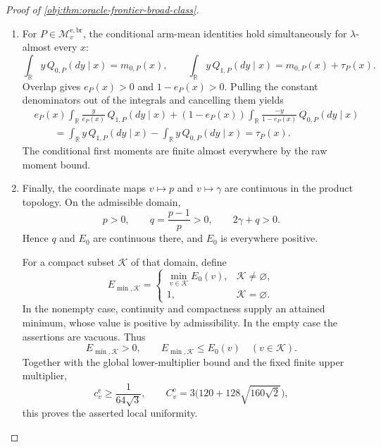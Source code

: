 \documentclass[11pt]{article}
\begin{document}
\begin{proof}[Proof of \cref{obj:thm:oracle-frontier-broad-class}]
\begin{enumerate}
\item For \(P\in\mathcal M_v^{\mathrm{e,br}}\), the conditional arm-mean identities hold simultaneously for \(\lambda\)-almost every \(x\):
\[
\int_{\mathbb R}y\,Q_{0,P}(dy\mid x)=m_{0,P}(x),
\qquad
\int_{\mathbb R}y\,Q_{1,P}(dy\mid x)
=m_{0,P}(x)+\tau_P(x).
\]
Overlap gives \(e_P(x)>0\) and \(1-e_P(x)>0\). Pulling the constant denominators out of the integrals and cancelling them yields
\[
\begin{aligned}
&e_P(x)\int_{\mathbb R}\frac{y}{e_P(x)}\,Q_{1,P}(dy\mid x)
+(1-e_P(x))\int_{\mathbb R}\frac{-y}{1-e_P(x)}\,Q_{0,P}(dy\mid x)\\
&\qquad=
\int_{\mathbb R}y\,Q_{1,P}(dy\mid x)
-\int_{\mathbb R}y\,Q_{0,P}(dy\mid x)
=\tau_P(x).
\end{aligned}
\]
The conditional first moments are finite almost everywhere by the raw moment bound.

\item Finally, the coordinate maps \(v\mapsto p\) and \(v\mapsto\gamma\) are continuous in the product topology. On the admissible domain,
\[
p>0,\qquad
q=\frac{p-1}{p}>0,\qquad
2\gamma+q>0.
\]
Hence \(q\) and \(E_0\) are continuous there, and \(E_0\) is everywhere positive.

For a compact subset \(\mathcal K\) of that domain, define
\[
E_{\min,\mathcal K}
=
\begin{cases}
\displaystyle\min_{v\in\mathcal K}E_0(v),&\mathcal K\ne\varnothing,\\[1mm]
1,&\mathcal K=\varnothing.
\end{cases}
\]
In the nonempty case, continuity and compactness supply an attained minimum, whose value is positive by admissibility. In the empty case the assertions are vacuous. Thus
\[
E_{\min,\mathcal K}>0,
\qquad
E_{\min,\mathcal K}\le E_0(v)\quad(v\in\mathcal K).
\]
Together with the global lower-multiplier bound and the fixed finite upper multiplier,
\[
c_v^{\mathrm e}\ge\frac1{64\sqrt3},
\qquad
C_v^{\mathrm e}=3\bigl(120+128\sqrt{160\sqrt2}\bigr),
\]
this proves the asserted local uniformity.
\end{enumerate}
\end{proof}
\end{document}
